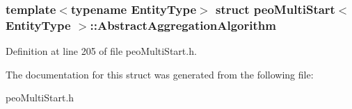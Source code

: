 \subsubsection*{template$<$typename Entity\-Type$>$ struct peo\-Multi\-Start$<$ Entity\-Type $>$::Abstract\-Aggregation\-Algorithm}





Definition at line 205 of file peo\-Multi\-Start.h.

The documentation for this struct was generated from the following file:\begin{CompactItemize}
\item 
peo\-Multi\-Start.h\end{CompactItemize}
